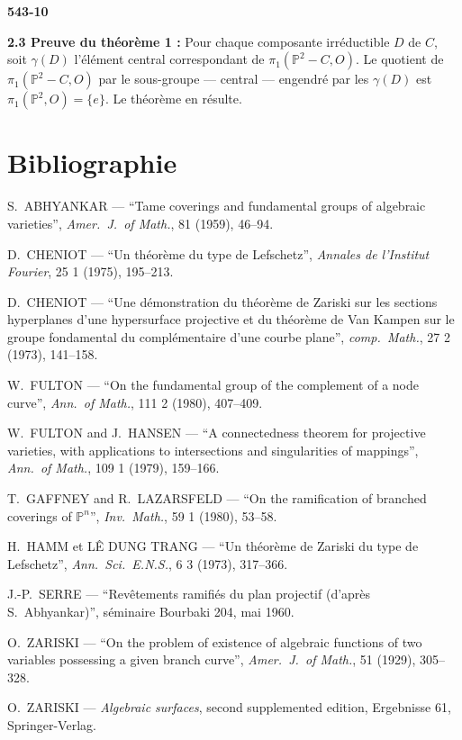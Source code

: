 \documentclass[12pt,a4paper]{article}
\begin{document}
\newpage
\begin{flushright}
\textbf{543-10}
\end{flushright}

\textbf{2.3 Preuve du théorème 1 :} Pour chaque composante irréductible $D$ de $C$, soit $\gamma(D)$ l'élément central correspondant de $\pi_1(\mathbb{P}^2 - C, O)$. Le quotient de $\pi_1(\mathbb{P}^2 - C, O)$ par le sous-groupe --- central --- engendré par les $\gamma(D)$ est $\pi_1(\mathbb{P}^2, O) = \{e\}$. Le théorème en résulte.

\section*{Bibliographie}

\begin{enumerate}[label={[\arabic*]}]
\item S.\ ABHYANKAR --- ``Tame coverings and fundamental groups of algebraic varieties'', \textit{Amer.\ J.\ of Math.}, 81 (1959), 46--94.
\item D.\ CHENIOT --- ``Un théorème du type de Lefschetz'', \textit{Annales de l'Institut Fourier}, 25 1 (1975), 195--213.
\item[{$[2$ bis$]$}] D.\ CHENIOT --- ``Une démonstration du théorème de Zariski sur les sections hyperplanes d'une hypersurface projective et du théorème de Van Kampen sur le groupe fondamental du complémentaire d'une courbe plane'', \textit{comp.\ Math.}, 27 2 (1973), 141--158.
\item W.\ FULTON --- ``On the fundamental group of the complement of a node curve'', \textit{Ann.\ of Math.}, 111 2 (1980), 407--409.
\item W.\ FULTON and J.\ HANSEN --- ``A connectedness theorem for projective varieties, with applications to intersections and singularities of mappings'', \textit{Ann.\ of Math.}, 109 1 (1979), 159--166.
\item T.\ GAFFNEY and R.\ LAZARSFELD --- ``On the ramification of branched coverings of $\mathbb{P}^n$'', \textit{Inv.\ Math.}, 59 1 (1980), 53--58.
\item H.\ HAMM et LÊ DUNG TRANG --- ``Un théorème de Zariski du type de Lefschetz'', \textit{Ann.\ Sci.\ E.N.S.}, 6 3 (1973), 317--366.
\item J.-P.\ SERRE --- ``Revêtements ramifiés du plan projectif (d'après S.\ Abhyankar)'', séminaire Bourbaki 204, mai 1960.
\item O.\ ZARISKI --- ``On the problem of existence of algebraic functions of two variables possessing a given branch curve'', \textit{Amer.\ J.\ of Math.}, 51 (1929), 305--328.
\item[{$[9]$}] O.\ ZARISKI --- \textit{Algebraic surfaces}, second supplemented edition, Ergebnisse 61, Springer-Verlag.
\end{enumerate}
\end{document}
